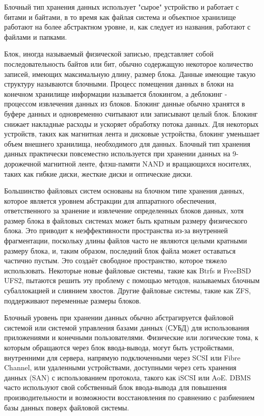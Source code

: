 \par
Блочный тип хранения данных использует "сырое" устройство и работает с битами и байтами, в то время как файлая система и объектное хранилище работают на более абстрактном уровне, и, как следует из названия, работают с файлами и папками.  
\par
Блок, иногда называемый физической записью, представляет собой последовательность байтов или бит, обычно содержащую некоторое количество записей, имеющих максимальную длину, размер блока. Данные имеющие такую структуру называются блочными. 	Процесс помещения данных в блоки на конечном хранилище информации называется блокингом, а деблокинг - процессом извлечения данных из блоков. Блокинг данные обычно хранятся в буфере данных и одновременно считывают или записывают целый блок. Блокинг снижает накладные расходы и ускоряет обработку потока данных. Для некоторых устройств, таких как магнитная лента и дисковые устройства, блокинг уменьшает объем внешнего хранилища, необходимого для данных. Блочный тип хранения данных практически повсеместно используется при хранении данных на 9-дорожечной магнитной ленте, флэш-памяти NAND и вращающихся носителях, таких как гибкие диски, жесткие диски и оптические диски.
\par 
Большинство файловых систем основаны на блочном типе хранения данных, которое является уровнем абстракции для аппаратного обеспечения, ответственного за хранение и извлечение определенных блоков данных, хотя размер блока в файловых системах может быть кратным размеру физического блока. Это приводит к неэффективности пространства из-за внутренней фрагментации, поскольку длины файлов часто не являются целыми кратными размеру блока, и, таким образом, последний блок файла может оставаться частично пустым. Это создаёт свободное пространство, которое тяжело использовать. Некоторые новые файловые системы, такие как Btrfs и FreeBSD UFS2, пытаются решить эту проблему с помощью методов, называемых блочным субаллокацией и слиянием хвостов. Другие файловые системы, такие как ZFS, поддерживают переменные размеры блоков.
\par 
Блочный уровень при хранении данных обычно абстрагируется файловой системой или системой управления базами данных (СУБД) для использования приложениями и конечными пользователями. Физические или логические тома, к которым обращаются через блок ввода-вывода, могут быть устройствами, внутренними для сервера, напрямую подключенными через SCSI или Fibre Channel, или удаленными устройствами, доступными через сеть хранения данных (SAN) с использованием протокола, такого как iSCSI или AoE. DBMS часто используют свой собственный блок ввода-вывода для повышения производительности и возможности восстановления по сравнению с разбиением базы данных поверх файловой системы.
